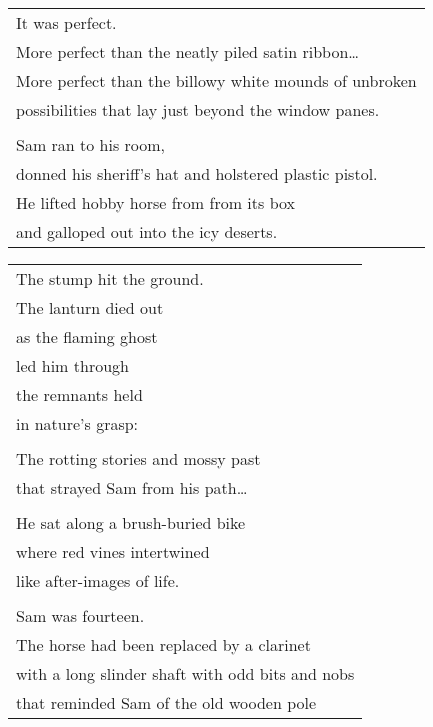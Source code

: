 \documentclass{article}
\begin{document}
\begin{center}
\begin{tabular}{l}
\hspace*{2ex}It was perfect. \\
\hspace*{2ex}More perfect than the neatly piled satin ribbon\ldots \\
\hspace*{2ex}More perfect than the billowy white mounds of unbroken \\
\hspace*{2ex}possibilities that lay just beyond the window panes. \\
\\
\hspace*{2ex}Sam ran to his room, \\
\hspace*{2ex}donned his sheriff's hat and holstered plastic pistol. \\
\hspace*{2ex}He lifted hobby horse from from its box \\
\hspace*{2ex}and galloped out into the icy deserts. \\
\end{tabular}
\begin{tabular}{l}
The stump hit the ground. \\
The lanturn died out \\
as the flaming ghost \\
led him through \\
the remnants held \\
in nature's grasp: \\
\\
The rotting stories and mossy past \\
that strayed Sam from his path\ldots \\
\\
He sat along a brush-buried bike \\
where red vines intertwined \\
like after-images of life. \\
\\
\hspace*{2ex}Sam was fourteen. \\
\hspace*{2ex}The horse had been replaced by a clarinet \\
\hspace*{2ex}with a long slinder shaft with odd bits and nobs \\
\hspace*{2ex}that reminded Sam of the old wooden pole \\

\end{tabular}
\end{center}
\end{document}
